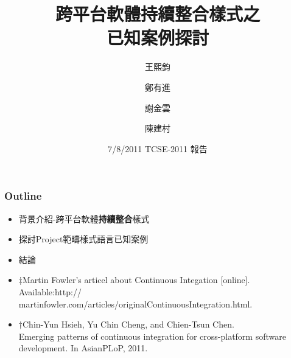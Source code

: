 \documentclass[utf8x]{beamer}
\begin{document}
 
\date[7/8/2011]{7/8/2011 TCSE-2011 報告} 
\title[跨平台軟體持續整合樣式之已知案例探討]{跨平台軟體持續整合樣式之\\已知案例探討} 
\author[王熙鈞] 
        { 王熙鈞\inst{} \and 鄭有進\inst{\ddag} \and 謝金雲\inst{\ddag} \and 陳建村\inst{\ddag} } 




\begin{frame}%
    \titlepage\end{frame} 


\begin{frame}%

\frametitle{Outline} 

\begin{itemize}
\setlength{\itemindent}{1em}
\item 背景介紹\hspace{3pt}-\hspace{3pt}跨平台軟體\hspace{2pt}\textbf{持續整合}\ddag\hspace{2pt}樣式\dag
\item 探討Project範疇樣式語言已知案例%
\item 結論%
\fontsize{6pt}{4pt}\selectfont
\item[] $\ddag$Martin Fowler's articel about Continuous Integation [online]. Available:http:// martinfowler.com/articles/originalContinuousIntegration.html.
\item[] $\dag$Chin-Yun Hsieh, Yu Chin Cheng, and Chien-Tsun Chen. \\Emerging patterns of continuous integration for cross-platform software development. In AsianPLoP, 2011.
\end{itemize}
\end{frame} 
 
\end{document}
